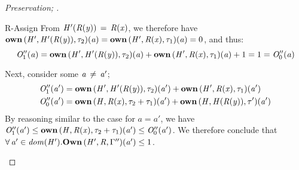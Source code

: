\begin{proof}[Preservation; ]
\begin{rneqncase}{R-Assign}
    From $\mathit{H'}  (  \mathit{R}  (  \mathit{y}  )  ) \, = \, \mathit{R}  (  \mathit{x}  )$, we therefore have $\mathbf{own} \, (  \mathit{H'}  ,  \mathit{H'}  (  \mathit{R}  (  \mathit{y}  )  )  ,  \tau_{{\mathrm{2}}}  )  (  \mathit{a}  )  =  \mathbf{own} \, (  \mathit{H'}  ,  \mathit{R}  (  \mathit{x}  )  ,  \tau_{{\mathrm{1}}}  )  (  \mathit{a}  )  =  0$,
    and thus:
    \[
      \mathit{O''_{{\mathrm{1}}}}  (  \mathit{a}  )  =  \mathbf{own} \, (  \mathit{H'}  ,  \mathit{H'}  (  \mathit{R}  (  \mathit{y}  )  )  ,  \tau_{{\mathrm{2}}}  )  (  \mathit{a}  )  +  \mathbf{own} \, (  \mathit{H'}  ,  \mathit{R}  (  \mathit{x}  )  ,  \tau_{{\mathrm{1}}}  )  (  \mathit{a}  )  +  1  =  1  =  \mathit{O''_{{\mathrm{0}}}}  (  \mathit{a}  )
    \]
    
    Next, consider some $\mathit{a} \, \neq \, \mathit{a'}$;
    \begin{align*}
      \mathit{O''_{{\mathrm{1}}}}  (  \mathit{a'}  ) & = \mathbf{own} \, (  \mathit{H'}  ,  \mathit{H'}  (  \mathit{R}  (  \mathit{y}  )  )  ,  \tau_{{\mathrm{2}}}  )  (  \mathit{a'}  )  +  \mathbf{own} \, (  \mathit{H'}  ,  \mathit{R}  (  \mathit{x}  )  ,  \tau_{{\mathrm{1}}}  )  (  \mathit{a'}  ) \\
      \mathit{O''_{{\mathrm{0}}}}  (  \mathit{a'}  ) & = \mathbf{own} \, (  \mathit{H}  ,  \mathit{R}  (  \mathit{x}  )  ,  \tau_{{\mathrm{2}}}  +  \tau_{{\mathrm{1}}}  )  (  \mathit{a'}  )  +  \mathbf{own} \, (  \mathit{H}  ,  \mathit{H}  (  \mathit{R}  (  \mathit{y}  )  )  ,  \tau'  )  (  \mathit{a'}  )
    \end{align*}
    By reasoning similar to the case for $a = a'$, we have $\mathit{O''_{{\mathrm{1}}}}  (  \mathit{a'}  )  \le  \mathbf{own} \, (  \mathit{H}  ,  \mathit{R}  (  \mathit{x}  )  ,  \tau_{{\mathrm{2}}}  +  \tau_{{\mathrm{1}}}  )  (  \mathit{a'}  )  \le  \mathit{O''_{{\mathrm{0}}}}  (  \mathit{a'}  )$.
    We therefore conclude that $\forall \,  \mathit{a'}  \in \mathit{dom}( \mathit{H'} )   .  \mathbf{Own} \, (  \mathit{H'}  ,  \mathit{R}  ,  \Gamma''  )  (  \mathit{a'}  )  \le  1$.
  \end{rneqncase} %
  

\end{proof}
